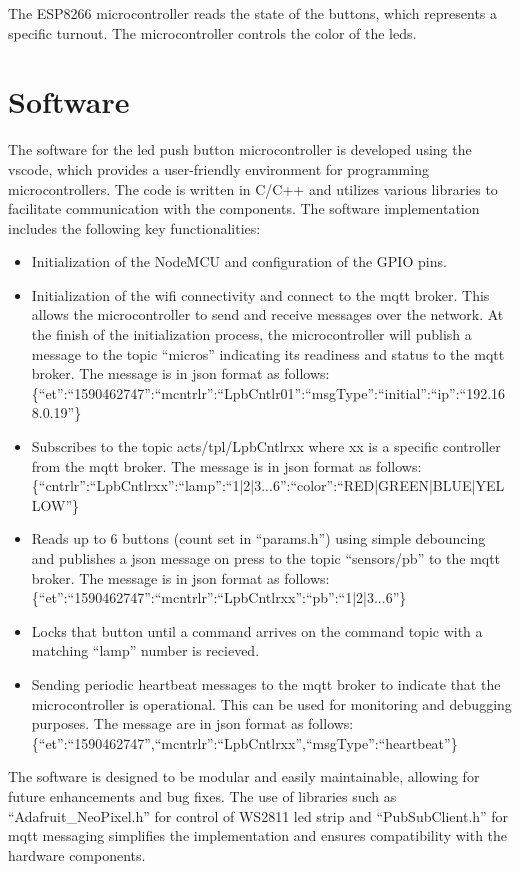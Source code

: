 The ESP8266 microcontroller reads the state of the buttons, which represents a specific turnout. The microcontroller controls the color of the \glspl{led}.
\section{Software}
The software for the \gls{led} push button microcontroller is developed using the \gls{vscode}, which provides a user-friendly environment for programming microcontrollers. The code is written in C/C++ and utilizes various libraries to facilitate communication with the components. The software implementation includes the following key functionalities:
\begin{itemize}
    \item Initialization of the NodeMCU and configuration of the GPIO pins.
    \item Initialization of the \gls{wifi} connectivity and connect to the \gls{mqtt} broker. This allows the microcontroller to send and receive messages over the network. At the finish of the initialization process, the microcontroller will publish a message to the topic ``micros''  indicating its readiness and status to the \gls{mqtt} broker. The message is in \gls{json} format as follows:\\
\{``et'':``1590462747'':``mcntrlr'':``LpbCntlr01'':``msgType'':``initial'':``ip'':``192.168.0.19''\}
    \item Subscribes to the topic acts/tpl/LpbCntlrxx where xx is a specific controller from the \gls{mqtt} broker. The message is in \gls{json} format as follows:\\
\{``cntrlr'':``LpbCntlrxx'':``lamp'':``1|2|3...6'':``color'':``RED|GREEN|BLUE|YELLOW''\}
    \item Reads up to 6 buttons (count set in ``params.h'') using simple debouncing and publishes a \gls{json} message on press to the topic ``sensors/pb'' to the \gls{mqtt} broker. The message is in \gls{json} format as follows:\\
    \{``et'':``1590462747'':``mcntrlr'':``LpbCntlrxx'':``pb'':``1|2|3...6''\}
    \item Locks that button until a command arrives on the command topic with a matching ``lamp'' number is recieved.
    \item Sending periodic heartbeat messages to the \gls{mqtt} broker to indicate that the microcontroller is operational. This can be used for monitoring and debugging purposes. The message are in \gls{json} format as follows:\\
\{``et'':``1590462747'',``mcntrlr'':``LpbCntlrxx'',``msgType'':``heartbeat''\}
\end{itemize}
The software is designed to be modular and easily maintainable, allowing for future enhancements and bug fixes. The use of libraries such as ``Adafruit\_NeoPixel.h'' for control of WS2811 \gls{led} strip and ``PubSubClient.h'' for \gls{mqtt} messaging simplifies the implementation and ensures compatibility with the hardware components.

